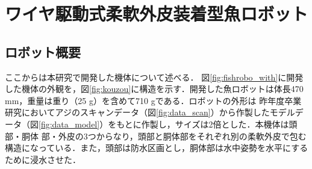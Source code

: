 \newpage

\section{ワイヤ駆動式柔軟外皮装着型魚ロボット}
\subsection{ロボット概要}
ここからは本研究で開発した機体について述べる．
図\ref{fig:fishrobo_with}に開発した機体の外観を，図\ref{fig:kouzou}に構造を示す．開発した魚ロボットは体長470 mm，重量は重り（25 g）を含めて710 gである．ロボットの外形は
昨年度卒業研究においてアジのスキャンデータ（図\ref{fig:data_scan}）から作製したモデルデータ（図\ref{fig:data_model}）をもとに作製し，サイズは2倍とした．本機体は頭部・胴体
部・外皮の3つからなり，頭部と胴体部をそれぞれ別の柔軟外皮で包む構造になっている．また，頭部は防水区画とし，胴体部は水中姿勢を水平にするために浸水させた．

